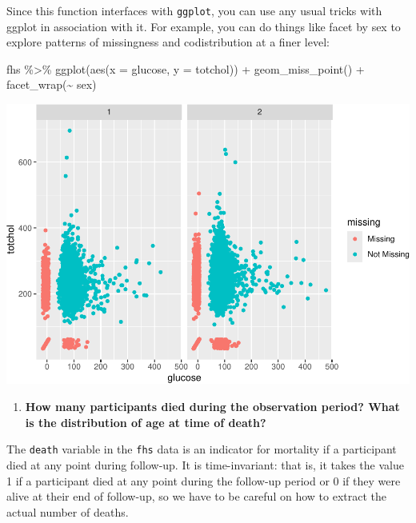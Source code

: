 \documentclass[
]{book}
\newenvironment{Shaded}{\begin{snugshade}}{\end{snugshade}}
\newcommand{\AttributeTok}[1]{\textcolor[rgb]{0.77,0.63,0.00}{#1}}
\newcommand{\FunctionTok}[1]{\textcolor[rgb]{0.00,0.00,0.00}{#1}}
\newcommand{\NormalTok}[1]{#1}
\newcommand{\SpecialCharTok}[1]{\textcolor[rgb]{0.00,0.00,0.00}{#1}}
\providecommand{\tightlist}{%
  \setlength{\itemsep}{0pt}\setlength{\parskip}{0pt}}
\begin{document}
Since this function interfaces with \texttt{ggplot}, you can use any usual tricks with ggplot in association with it. For example, you can do things like facet by sex to explore patterns of missingness and codistribution at a finer level:

\begin{Shaded}
\begin{Highlighting}[]
\NormalTok{fhs }\SpecialCharTok{\%\textgreater{}\%} 
  \FunctionTok{ggplot}\NormalTok{(}\FunctionTok{aes}\NormalTok{(}\AttributeTok{x =}\NormalTok{ glucose, }\AttributeTok{y =}\NormalTok{ totchol)) }\SpecialCharTok{+} 
  \FunctionTok{geom\_miss\_point}\NormalTok{() }\SpecialCharTok{+} 
  \FunctionTok{facet\_wrap}\NormalTok{(}\SpecialCharTok{\textasciitilde{}}\NormalTok{ sex)}
\end{Highlighting}
\end{Shaded}

\includegraphics{adv_epi_analysis_files/figure-latex/unnamed-chunk-178-1.pdf}

\begin{enumerate}
\def\labelenumi{\arabic{enumi}.}
\setcounter{enumi}{2}
\tightlist
\item
  \textbf{How many participants died during the observation period? What is the distribution of age at time of death?}
\end{enumerate}

The \texttt{death} variable in the \texttt{fhs} data is an indicator for mortality if a participant died at any point during follow-up. It is time-invariant: that is, it takes the value 1 if a participant died at any point during the follow-up period or 0 if they were alive at their end of follow-up, so we have to be careful on how to extract the actual number of deaths.
\end{document}
